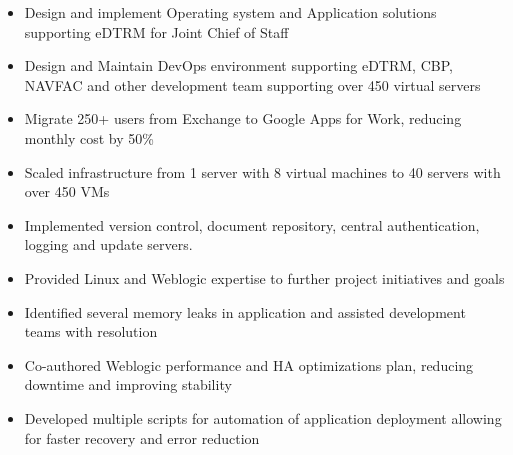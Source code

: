 \documentclass[10pt,a4paper,roman]{moderncv} %
\begin{document}
{
\begin{itemize}
\item Design and implement Operating system and Application solutions supporting eDTRM for Joint Chief of Staff
\item Design and Maintain DevOps environment supporting eDTRM, CBP, NAVFAC and other development team supporting over 450 virtual servers
\item Migrate 250+ users from Exchange to Google Apps for Work, reducing monthly cost by 50\%
\item Scaled infrastructure from 1 server with 8 virtual machines to 40 servers with over 450 VMs
\item Implemented version control, document repository, central authentication, logging and update servers.
\end{itemize}}



{%
\begin{itemize}
\item Provided Linux and Weblogic expertise to further project initiatives and goals
\item Identified several memory leaks in application and assisted development teams with resolution
\item Co-authored Weblogic performance and HA optimizations plan, reducing downtime and improving stability
\item Developed multiple scripts for automation of application deployment allowing for faster recovery and error reduction
\end{itemize}}


\end{document}
